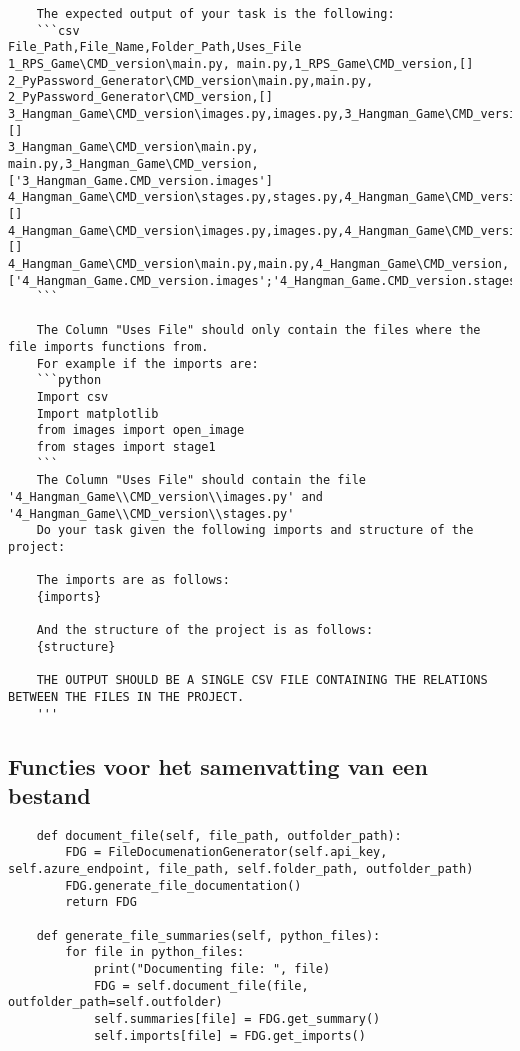 \begin{verbatim}
    The expected output of your task is the following:
    ```csv
File_Path,File_Name,Folder_Path,Uses_File
1_RPS_Game\CMD_version\main.py, main.py,1_RPS_Game\CMD_version,[]
2_PyPassword_Generator\CMD_version\main.py,main.py, 2_PyPassword_Generator\CMD_version,[]
3_Hangman_Game\CMD_version\images.py,images.py,3_Hangman_Game\CMD_version,[]
3_Hangman_Game\CMD_version\main.py, main.py,3_Hangman_Game\CMD_version,['3_Hangman_Game.CMD_version.images']
4_Hangman_Game\CMD_version\stages.py,stages.py,4_Hangman_Game\CMD_version,[]
4_Hangman_Game\CMD_version\images.py,images.py,4_Hangman_Game\CMD_version,[]
4_Hangman_Game\CMD_version\main.py,main.py,4_Hangman_Game\CMD_version,['4_Hangman_Game.CMD_version.images';'4_Hangman_Game.CMD_version.stages']
    ```

    The Column "Uses File" should only contain the files where the file imports functions from.
    For example if the imports are:
    ```python
    Import csv
    Import matplotlib
    from images import open_image
    from stages import stage1
    ```
    The Column "Uses File" should contain the file '4_Hangman_Game\\CMD_version\\images.py' and '4_Hangman_Game\\CMD_version\\stages.py'
    Do your task given the following imports and structure of the project:
    
    The imports are as follows:
    {imports}

    And the structure of the project is as follows:
    {structure}

    THE OUTPUT SHOULD BE A SINGLE CSV FILE CONTAINING THE RELATIONS BETWEEN THE FILES IN THE PROJECT.
    '''
\end{verbatim}

\subsection{Functies voor het samenvatting van een bestand}
\label{bijlage:file-summary-functions}
\begin{verbatim}
    def document_file(self, file_path, outfolder_path):
        FDG = FileDocumenationGenerator(self.api_key, self.azure_endpoint, file_path, self.folder_path, outfolder_path)
        FDG.generate_file_documentation()
        return FDG

    def generate_file_summaries(self, python_files):
        for file in python_files:
            print("Documenting file: ", file)
            FDG = self.document_file(file, outfolder_path=self.outfolder)
            self.summaries[file] = FDG.get_summary()
            self.imports[file] = FDG.get_imports()
\end{verbatim}

